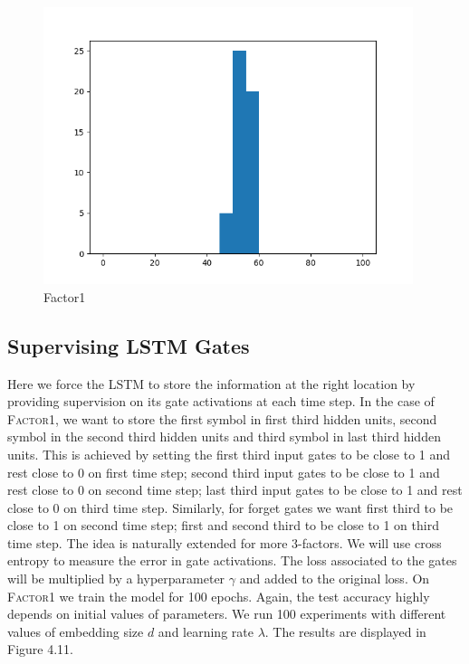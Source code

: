 \documentclass[titlepage]{report}
\begin{document}
\begin{figure}[H]
\centering
\includegraphics[width = 108mm]{figures/histograms/factor5/auto_pos/20-01}
\caption{Factor1}
\end{figure}

\subsection{Supervising LSTM Gates}

Here we force the LSTM to store the information at the right location by providing supervision on its gate activations at each time step. In the case of \textsc{Factor1}, we want to store the first symbol in first third hidden units, second symbol in the second third hidden units and third symbol in last third hidden units. This is achieved by setting the first third input gates to be close to 1 and rest close to 0 on first time step; second third input gates to be close to 1 and rest close to 0 on second time step; last third input gates to be close to 1 and rest close to 0 on third time step. Similarly, for forget gates we want first third to be close to 1 on second time step; first and second third to be close to 1 on third time step. The idea is naturally extended for more 3-factors. We will use cross entropy to measure the error in gate activations. The loss associated to the gates will be multiplied by a hyperparameter $\gamma$ and added to the original loss. On \textsc{Factor1} we train the model for 100 epochs. Again, the test accuracy highly depends on initial values of parameters. We run 100 experiments with different values of embedding size $d$ and learning rate $\lambda$. The results are displayed in Figure 4.11.
\end{document}
